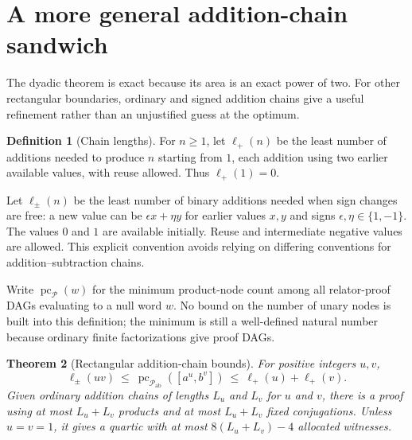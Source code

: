\documentclass[11pt,letterpaper]{article}
\newtheorem{theorem}{Theorem}[section]
\theoremstyle{definition}
\newtheorem{definition}[theorem]{Definition}
\theoremstyle{remark}
\newcommand{\Pp}{\mathcal P}
\newcommand{\pc}{\operatorname{pc}}
\begin{document}
\section{A more general addition-chain sandwich}\label{gts:vk:sec:addition-chain}

The dyadic theorem is exact because its area is an exact power of two. For other rectangular boundaries, ordinary and signed addition chains give a useful refinement rather than an unjustified guess at the optimum.

\begin{definition}[Chain lengths]
For $n\geq1$, let $\ell_+(n)$ be the least number of additions needed to produce $n$ starting from $1$, each addition using two earlier available values, with reuse allowed. Thus $\ell_+(1)=0$.

Let $\ell_{\pm}(n)$ be the least number of binary additions needed when sign changes are free: a new value can be $\epsilon x+\eta y$ for earlier values $x,y$ and signs $\epsilon,\eta\in\{1,-1\}$. The values $0$ and $1$ are available initially. Reuse and intermediate negative values are allowed. This explicit convention avoids relying on differing conventions for addition--subtraction chains.
\end{definition}

Write $\pc_{\Pp}(w)$ for the minimum product-node count among all relator-proof DAGs evaluating to a null word $w$. No bound on the number of unary nodes is built into this definition; the minimum is still a well-defined natural number because ordinary finite factorizations give proof DAGs.

\begin{theorem}[Rectangular addition-chain bounds]\label{gts:vk:thm:addition}
For positive integers $u,v$,
\begin{equation}\label{gts:vk:eq:chain-sandwich}
 \ell_{\pm}(uv)\ \leq\
 \pc_{\Pp_{\mathrm{ab}}}([a^u,b^v])\ \leq\
 \ell_+(u)+\ell_+(v).
\end{equation}
Given ordinary addition chains of lengths $L_u$ and $L_v$ for $u$ and $v$, there is a proof using at most $L_u+L_v$ products and at most $L_u+L_v$ fixed conjugations. Unless $u=v=1$, it gives a quartic with at most $8(L_u+L_v)-4$ allocated witnesses.
\end{theorem}
\end{document}
